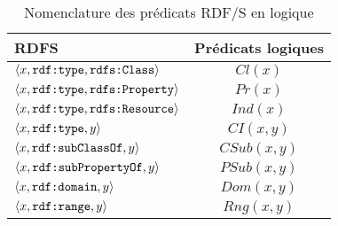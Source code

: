 \begin{table}[ht]
    \centering
    \begin{tabular}{|l|c|}
        \hline
        RDFS                                                       & Prédicats logiques \\
        \hline
        $\langle x, \verb|rdf:type|, \verb|rdfs:Class| \rangle$    & $Cl(x)$            \\
        $\langle x, \verb|rdf:type|, \verb|rdfs:Property| \rangle$ & $Pr(x)$            \\
        $\langle x, \verb|rdf:type|, \verb|rdfs:Resource| \rangle$ & $Ind(x)$           \\
        $\langle x, \verb|rdf:type|, y \rangle$                    & $CI(x, y)$         \\
        $\langle x, \verb|rdf:subClassOf|, y \rangle$              & $CSub(x, y)$       \\
        $\langle x, \verb|rdf:subPropertyOf|, y \rangle$           & $PSub(x, y)$       \\
        $\langle x, \verb|rdf:domain|, y \rangle$                  & $Dom(x, y)$        \\
        $\langle x, \verb|rdf:range|, y \rangle$                   & $Rng(x, y)$        \\
        \hline
    \end{tabular}
    \caption{Nomenclature des prédicats RDF/S en logique}
    \label{table:update:soa:rdfs}
\end{table}

